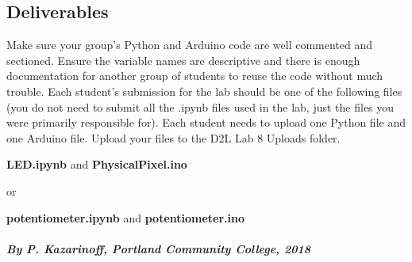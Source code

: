 \documentclass[11pt]{article}
\begin{document}
    \hypertarget{deliverables}{%
\subsection{Deliverables}\label{deliverables}}

Make sure your group's Python and Arduino code are well commented and
sectioned. Ensure the variable names are descriptive and there is enough
documentation for another group of students to reuse the code without
much trouble. Each student's submission for the lab should be one of the
following files (you do not need to submit all the .ipynb files used in
the lab, just the files you were primarily responsible for). Each
student needs to upload one Python file and one Arduino file. Upload
your files to the D2L Lab 8 Uploads folder.

\textbf{LED.ipynb} and \textbf{PhysicalPixel.ino}

or

\textbf{potentiometer.ipynb} and \textbf{potentiometer.ino}

    \hypertarget{by-p.-kazarinoff-portland-community-college-2018}{%
\paragraph{\texorpdfstring{\emph{By P. Kazarinoff, Portland Community
College,
2018}}{By P. Kazarinoff, Portland Community College, 2018}}\label{by-p.-kazarinoff-portland-community-college-2018}}
\end{document}
